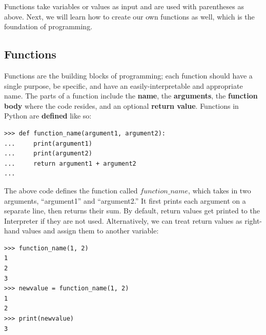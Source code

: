 \documentclass[a4paper,11pt]{article}
\begin{document}
Functions take variables or values as input and are used with parentheses as above.  Next, we will learn
how to create our own functions as well, which is the foundation of programming.

\pagebreak
\subsection{Functions}
Functions are the building blocks of programming; each function should have a single purpose, be specific, 
and have an easily-interpretable and appropriate name.  The parts of a function include the \textbf{name}, 
the \textbf{arguments}, the \textbf{function body} where the code resides, and an optional \textbf{return value}.  
Functions in Python are \textbf{defined} like so:

\vspace{3mm}
\begin{lstlisting}
>>> def function_name(argument1, argument2):
...     print(argument1)
...     print(argument2)
...     return argument1 + argument2
...
\end{lstlisting}
\vspace{3mm}

The above code defines the function called $function\_name$, which takes in two arguments, ``argument1'' and 
``argument2.'' It first prints each argument on a separate line, then returns their sum.  By default, return
values get printed to the Interpreter if they are not used.  Alternatively, we can treat return values as
right-hand values and assign them to another variable:

\vspace{3mm}
\begin{lstlisting}
>>> function_name(1, 2)
1
2
3
>>> newvalue = function_name(1, 2)
1
2
>>> print(newvalue)
3
\end{lstlisting}
\vspace{3mm}
\end{document}
